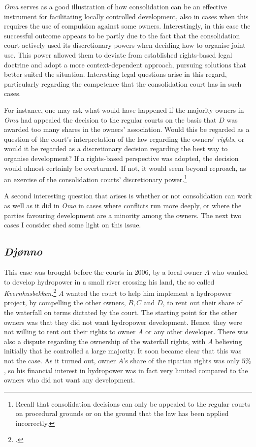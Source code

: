 \emph{Oma} serves as a good illustration of how consolidation can be an effective instrument for facilitating locally controlled development, also in cases when this requires the use of compulsion against some owners. Interestingly, in this case the successful outcome appears to be partly due to the fact that the consolidation court actively used its discretionary powers when deciding how to organise joint use. This power allowed them to deviate from established rights-based legal doctrine and adopt a more context-dependent approach, pursuing solutions that better suited the situation. Interesting legal questions arise in this regard, particularly regarding the competence that the consolidation court has in such cases. 

For instance, one may ask what would have happened if the majority owners in \emph{Oma} had appealed the decision to the regular courts on the basis that $D$ was awarded too many shares in the owners' association. Would this be regarded as a question of the court's interpretation of the law regarding the owners' \emph{rights}, or would it be regarded as a discretionary decision regarding the best way to organise development? If a rights-based perspective was adopted, the decision would almost certainly be overturned. If not, it would seem beyond reproach, as an exercise of the consolidation courts' discretionary power.\footnote{Recall that consolidation decisions can only be appealed to the regular courts on procedural grounds or on the ground that the law has been applied incorrectly.}

A second interesting question that arises is whether or not consolidation can work as well as it did in \emph{Oma} in cases where conflicts run more deeply, or where the parties favouring development are a minority among the owners. The next two cases I consider shed some light on this issue.

\subsection{\emph{Djønno}}

This case was brought before the courts in 2006, by a local owner $A$ who wanted to develop hydropower in a small river crossing his land, the so called \emph{Kvernhusbekken}.\footcite{djonno06} $A$ wanted the court to help him implement a hydropower project, by compelling the other owners, $B, C$ and $D$, to rent out their share of the waterfall on terms dictated by the court. The starting point for the other owners was that they did not want hydropower development. Hence, they were not willing to rent out their rights to owner $A$ or any other developer. There was also a dispute regarding the ownership of the waterfall rights, with $A$ believing initially that he controlled a large majority. It soon became clear that this was not the case. As it turned out, owner $A$'s share of the riparian rights was only $5 \%$, so his financial interest in hydropower was in fact very limited compared to the owners who did not want any development.

